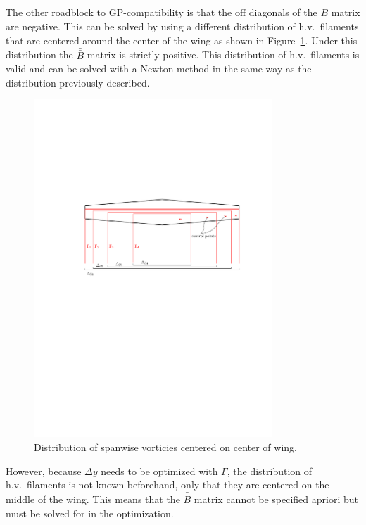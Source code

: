 \documentclass[10pt, a4paper]{article}
\begin{document}
The other roadblock to GP-compatibility is that the off diagonals of the $\bar{\bar{B}}$ matrix are negative. This can be solved by using a different distribution of h.v.\ filaments that are centered around the center of the wing as shown in Figure~\ref{f:gp_form}.
Under this distribution the $\bar{\bar{B}}$ matrix is strictly positive.  
This distribution of h.v.\ filaments is valid and can be solved with a Newton method in the same way as the distribution previously described. 
\pagebreak
\begin{figure}[h!]
	\begin{center}
	\includegraphics[width=0.8\textwidth]{gp_form.pdf}
    \caption{Distribution of spanwise vorticies centered on center of wing.}
\label{f:gp_form}
\end{center}
\end{figure}

However, because $\Delta y$ needs to be optimized with $\Gamma$, the distribution of h.v.\ filaments is not known beforehand, only that they are centered on the middle of the wing.  
This means that the $\bar{\bar{B}}$ matrix cannot be specified apriori but must be solved for in the optimization.  
\end{document}
